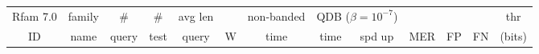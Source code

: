 %
%
%
%

\renewcommand{\baselinestretch}{1.0}
\begin{table}
\scriptsize
\begin{center}
\begin{tabular}{|ll|rr|rr|r|rr|rrrr|} \hline
\multicolumn{1}{|c}{Rfam 7.0} & \multicolumn{1}{c|}{family} &
\multicolumn{1}{c}{\#} & \multicolumn{1}{c|}{\#} &
\multicolumn{1}{c}{avg len} & \multicolumn{1}{c|}{} &
\multicolumn{1}{c}{non-banded} & \multicolumn{2}{|c|}{QDB
    ($\beta=10^{-7}$)} &  \multicolumn{3}{|c}{} & \multicolumn{1}{c|}{thr} \\ 
\multicolumn{1}{|c}{ID} & \multicolumn{1}{c|}{name} &
\multicolumn{1}{c}{query} & \multicolumn{1}{c|}{test} &
\multicolumn{1}{c}{query} & \multicolumn{1}{c|}{W} &
\multicolumn{1}{|c|}{time} & \multicolumn{1}{|c}{time} &
    \multicolumn{1}{c|}{spd up} & \multicolumn{1}{c}{MER} &
      \multicolumn{1}{c}{FP} & \multicolumn{1}{c}{FN} &
      \multicolumn{1}{c|}{(bits)} \\ \hline 


\end{tabular}
\end{center}
\end{table}
